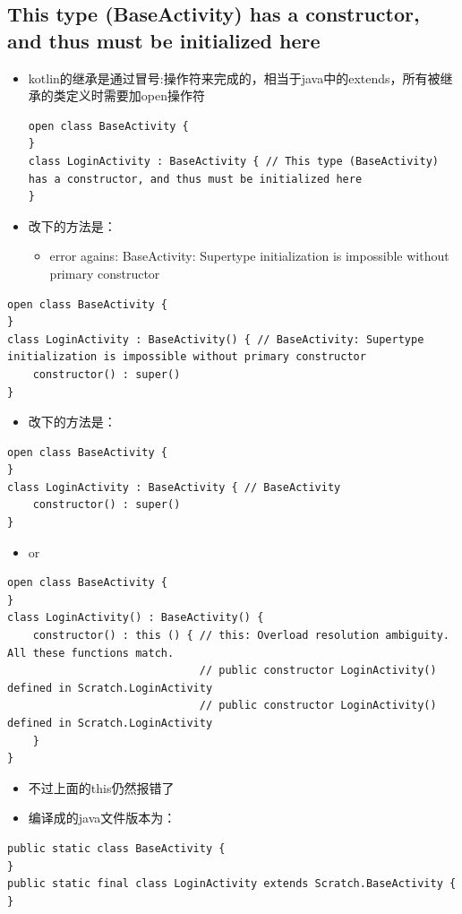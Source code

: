 \documentclass[9pt, b5paper]{article}
\begin{document}
\subsection{This type (BaseActivity) has a constructor, and thus must be initialized here}
\label{sec-7-2}
\begin{itemize}
\item kotlin的继承是通过冒号:操作符来完成的，相当于java中的extends，所有被继承的类定义时需要加open操作符
\begin{verbatim}
open class BaseActivity {
}
class LoginActivity : BaseActivity { // This type (BaseActivity) has a constructor, and thus must be initialized here
}
\end{verbatim}
\item 改下的方法是： 
\begin{itemize}
\item error agains: BaseActivity: Supertype initialization is impossible without primary constructor
\end{itemize}
\end{itemize}
\begin{verbatim}
open class BaseActivity {
}
class LoginActivity : BaseActivity() { // BaseActivity: Supertype initialization is impossible without primary constructor
    constructor() : super()
}
\end{verbatim}
\begin{itemize}
\item 改下的方法是：
\end{itemize}
\begin{verbatim}
open class BaseActivity {
}
class LoginActivity : BaseActivity { // BaseActivity
    constructor() : super()
}
\end{verbatim}
\begin{itemize}
\item or
\end{itemize}
\begin{verbatim}
open class BaseActivity {
}
class LoginActivity() : BaseActivity() {
    constructor() : this () { // this: Overload resolution ambiguity. All these functions match.
                              // public constructor LoginActivity() defined in Scratch.LoginActivity
                              // public constructor LoginActivity() defined in Scratch.LoginActivity
    }
}
\end{verbatim}
\begin{itemize}
\item 不过上面的this仍然报错了
\item 编译成的java文件版本为：
\end{itemize}
\begin{verbatim}
public static class BaseActivity {
}
public static final class LoginActivity extends Scratch.BaseActivity {
}
\end{verbatim}
\end{document}
